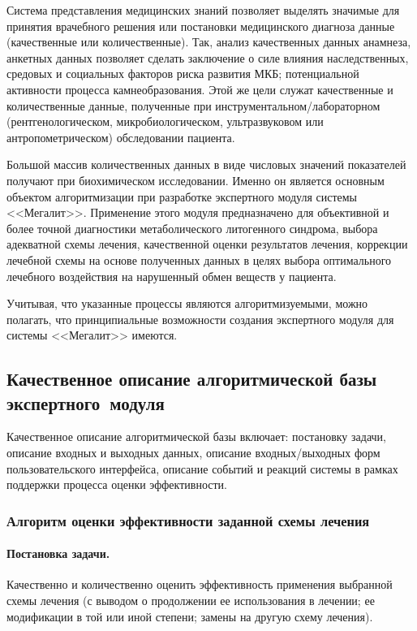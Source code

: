 \begin{multicols}{2}
      Система представления медицинских знаний позволяет выделять значимые для 
принятия врачебного решения или постановки медицинского диагноза данные (качественные 
или количественные). Так, анализ качественных данных анамнеза, анкетных данных позволяет 
сделать заключение о силе влияния наследственных, средовых и социальных факторов риска 
развития МКБ; потенциальной активности процесса камнеобразования. Этой же цели служат 
качественные и количественные данные, полученные при инструментальном/лабораторном 
(рентгенологическом, микробиологическом, ультразвуковом или антропометрическом) 
обследовании пациента.
      
      Большой массив количественных данных в виде числовых значений показателей 
получают при биохимическом исследовании. Именно он является основным объектом 
алгоритмизации при разработке экспертного модуля системы <<Мегалит>>. Применение 
этого модуля предназначено для объективной и более точной диагностики метаболического 
литогенного синдрома, выбора адекватной схемы лечения, качественной оценки результатов 
лечения, коррекции лечебной схемы на основе полученных данных в целях выбора 
оптимального лечебного воздействия на нарушенный обмен веществ у пациента.
      
      Учитывая, что указанные процессы являются алгоритмизуемыми, можно полагать, что 
принципиальные возможности создания экспертного модуля для системы <<Мегалит>> 
имеются.

\subsection{Качественное описание алгоритмической базы экспертного~модуля }

      Качественное описание алгоритмической базы включает: постановку задачи, описание 
входных и выходных данных, описание вход\-ных/вы\-ход\-ных форм пользовательского 
интерфейса, описание событий и реакций системы в рамках поддержки процесса оценки 
эффективности.
      
      \subsubsection*{Алгоритм оценки эффективности заданной схемы лечения}
      
      \paragraph*{Постановка задачи.} Качественно и количественно оценить эффективность 
применения выбранной схемы лечения (с выводом о продолжении ее использования в 
лечении; ее модификации в той или иной степени; замены на другую схему лечения).
      

\end{multicols}
